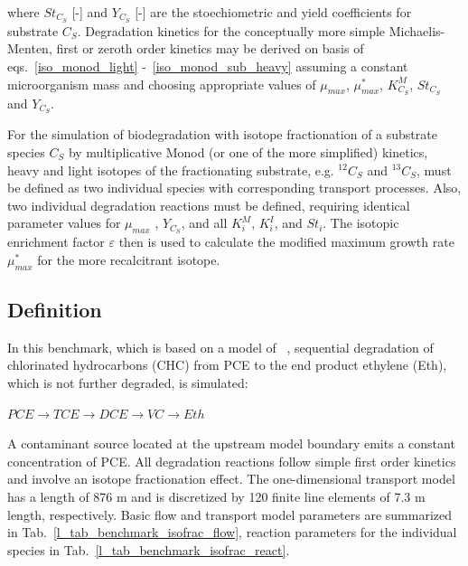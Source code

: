 where $St_{C_S}$ [-] and $Y_{C_S}$ [-] are the stoechiometric and yield coefficients for substrate $C_S$. Degradation kinetics for the conceptually more simple Michaelis-Menten, first or zeroth order kinetics may be derived on basis of eqs.~\ref{iso_monod_light} -~\ref{iso_monod_sub_heavy} assuming a constant microorganism mass and choosing appropriate values of $\mu_{max}$, $\mu_{max}^{\ast}$, $K^M_{C_S}$, $St_{C_S}$ and $Y_{C_S}$.

For the simulation of biodegradation with isotope fractionation of a substrate species $C_S$ by multiplicative Monod (or one of the more simplified) kinetics, heavy and light isotopes of the fractionating substrate, e.g.  $^{12}C_S$ and $^{13}C_S$, must be defined as two individual species with corresponding transport processes. Also, two individual degradation reactions must be defined, requiring identical parameter values for  $\mu_{max}$ , $Y_{C_S}$, and all $K^M_i$, $K^I_i$, and $St_i$. The isotopic enrichment factor $\varepsilon$ then is used to calculate the modified maximum growth rate $\mu_{max}^{\ast}$ for the more recalcitrant isotope.

\subsection{Definition}

In this benchmark, which is based on a model of ~\cite{VanBr:05}, sequential degradation of chlorinated hydrocarbons (CHC) from PCE to the end product ethylene (Eth), which is not further degraded, is simulated:

$PCE \rightarrow TCE \rightarrow DCE \rightarrow VC \rightarrow Eth $

A contaminant source located at the upstream model boundary emits a constant concentration of PCE. All degradation reactions follow simple first order kinetics and involve an isotope fractionation effect. The one-dimensional transport model has a length of 876 m and is discretized by 120 finite line elements of 7.3 m length, respectively. Basic flow and transport model parameters are summarized in Tab.~\ref{l_tab_benchmark_isofrac_flow}, reaction parameters for the individual species in Tab.~\ref{l_tab_benchmark_isofrac_react}.

